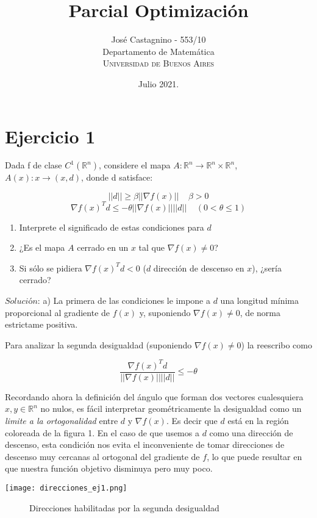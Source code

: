 \documentclass[12pt]{article}
\title{Parcial Optimización} %
\author{Jos\'e Castagnino - 553/10\\ 
Departamento de Matemática\\ 
\textsc{Universidad de Buenos Aires}
}
\date{Julio 2021.}
\begin{document}
\setlength{\droptitle}{-5em}    
\maketitle

\section*{Ejercicio 1}
Dada f de clase $C^1(\mathbb{R}^n)$, considere el mapa $A: \mathbb{R}^n \rightarrow \mathbb{R}^n \times \mathbb{R}^n$, $A(x): x \rightarrow (x, d)$, donde d satisface:

\[ ||d|| \geq \beta || \nabla f(x) || \ \ \ \ \  \beta > 0 \]
\[ \nabla f(x)^T d \leq - \theta || \nabla f(x) || ||d|| \ \ \ \ \ (0<\theta \leq 1) \]

\begin{enumerate}[label=(\alph*)]
    \item Interprete el significado de estas condiciones para $d$
    \item ¿Es el mapa $A$ cerrado en un $x$ tal que $\nabla f(x) \neq 0$?
    \item Si sólo se pidiera $\nabla f(x)^T d < 0$ ($d$ dirección de descenso en $x$), ¿sería cerrado?
\end{enumerate}

$\textit{Solución:}$ a) La primera de las condiciones le impone a $d$ una longitud mínima proporcional al gradiente de $f(x)$ y, suponiendo $\nabla f(x) \neq 0$, de norma estrictame positiva.

\bigskip
Para analizar la segunda desigualdad (suponiendo $\nabla f(x) \neq 0$) la reescribo como

\[ \frac{\nabla f(x)^T d}{|| \nabla f(x) ||||d||} \leq - \theta \]

\bigskip
\bigskip
Recordando ahora la definición del ángulo que forman dos vectores cualesquiera $x, y \in \mathbb{R}^n$ no nulos, es fácil interpretar geométricamente la desigualdad como un \textit{limite a la ortogonalidad} entre $d$ y $\nabla f(x)$. Es decir que $d$ está en la región coloreada de la figura 1. En el caso de que usemos a $d$ como una dirección de descenso, esta condición nos evita el inconveniente de tomar direcciones de descenso muy cercanas al ortogonal del gradiente de $f$, lo que puede resultar en que nuestra función objetivo disminuya pero muy poco.

\bigskip
\begin{center}
  \texttt{[image: direcciones\_ej1.png]}
  \begin{figure}[!h]
  \caption{Direcciones habilitadas por la segunda desigualdad}
  \end{figure}
\end{center}
\end{document}
